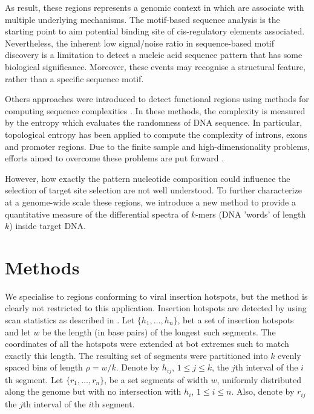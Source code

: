 \documentclass{bioinfo}
\begin{document}
As result, these regions represents a genomic context in which are associate with multiple underlying mechanisms. The motif-based sequence analysis is the starting point to aim potential binding site of cis-regulatory elements associated. Nevertheless, the inherent low signal/noise ratio in sequence-based motif discovery is a limitation to detect a nucleic acid sequence pattern that has some biological significance. Moreover, these events may recognise a structural feature, rather than a specific sequence motif.

Others approaches were introduced to detect functional regions using methods for computing sequence complexities \cite{pmid24533097,pmid21317142}. In these methods, the complexity is measured by the entropy which evaluates the randomness of DNA sequence. In particular, topological entropy has been applied to compute the complexity of introns, exons and promoter regions. Due to the finite sample and high-dimensionality problems, efforts aimed to overcome these problems are put forward \cite{pmid21317142}.

However, how exactly the pattern nucleotide composition could influence the selection of target site selection are not well understood. To further characterize at a genome-wide scale these regions, we introduce a new method to provide a quantitative measure of the differential spectra of $k$-mers (DNA 'words' of length $k$) inside target DNA.





\section{Methods}
We specialise to regions conforming to viral insertion hotspots, but the method is clearly not restricted to this application. Insertion hotspots are detected by using scan statistics as described in \cite{IRAMM}. Let $\{h_1, \ldots, h_n\}$, bet a set of insertion hotspots and let $w$ be the length (in base pairs) of the longest such segments. The coordinates of all the hotspots were extended at bot extremes such to match exactly this length. The resulting set of segments were partitioned into $k$ evenly spaced bins of length $\rho = w/k$. Denote by $h_{ij}$, $1 \leq j \leq k$, the $j$th interval of the $i$th segment. Let $\{r_1, \ldots, r_n\}$, be a set segments of width $w$, uniformly distributed along the genome but with no intersection with $h_{i}$, $1 \leq i \leq n$. Also, denote by $r_{ij}$ the $j$th interval of the $i$th segment.
\end{document}
